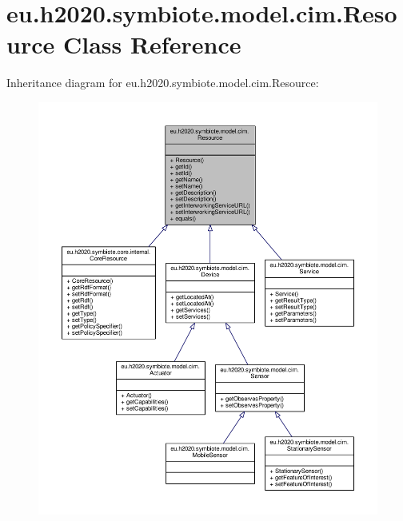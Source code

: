 \hypertarget{classeu_1_1h2020_1_1symbiote_1_1model_1_1cim_1_1Resource}{}\section{eu.\+h2020.\+symbiote.\+model.\+cim.\+Resource Class Reference}
\label{classeu_1_1h2020_1_1symbiote_1_1model_1_1cim_1_1Resource}


Inheritance diagram for eu.\+h2020.\+symbiote.\+model.\+cim.\+Resource\+:
\nopagebreak
\begin{figure}[H]
\begin{center}
\leavevmode
\includegraphics[width=350pt]{classeu_1_1h2020_1_1symbiote_1_1model_1_1cim_1_1Resource__inherit__graph}
\end{center}
\end{figure}


